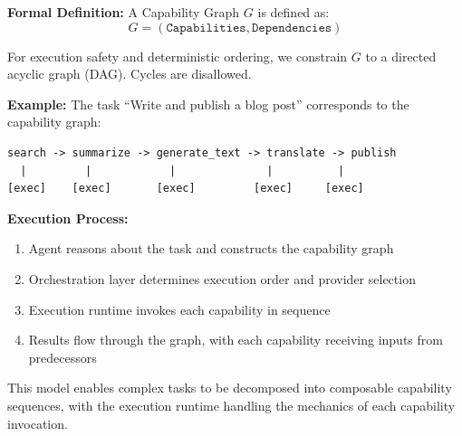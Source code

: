\textbf{Formal Definition:} A Capability Graph $G$ is defined as:
\[
G = (\texttt{Capabilities}, \texttt{Dependencies})
\]

For execution safety and deterministic ordering, we constrain $G$ to a directed acyclic graph (DAG). Cycles are disallowed.

\textbf{Example:} The task ``Write and publish a blog post'' corresponds to the capability graph:

\begin{verbatim}
search -> summarize -> generate_text -> translate -> publish
  |         |            |              |          |
[exec]    [exec]       [exec]         [exec]     [exec]
\end{verbatim}

\textbf{Execution Process:}
\begin{enumerate}
    \item Agent reasons about the task and constructs the capability graph
    \item Orchestration layer determines execution order and provider selection
    \item Execution runtime invokes each capability in sequence
    \item Results flow through the graph, with each capability receiving inputs from predecessors
\end{enumerate}

This model enables complex tasks to be decomposed into composable capability sequences, with the execution runtime handling the mechanics of each capability invocation.
